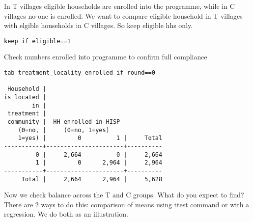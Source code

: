 \documentclass[12pt]{article}
\begin{document}
In T villages eligible households are enrolled into the programme, while in C villages no-one is enrolled. We want to compare eligible household in T villages with elgible households in C villages. So keep eligible hhs only. 

\begin{verbatim}
keep if eligible==1
\end{verbatim}

 Check numbers enrolled into programme to confirm full compliance
\begin{verbatim}
tab treatment_locality enrolled if round==0

 Household |
is located |
        in |
 treatment |
 community |  HH enrolled in HISP
    (0=no, |     (0=no, 1=yes)
    1=yes) |         0          1 |     Total
-----------+----------------------+----------
         0 |     2,664          0 |     2,664 
         1 |         0      2,964 |     2,964 
-----------+----------------------+----------
     Total |     2,664      2,964 |     5,628 

\end{verbatim}

 Now we check balance across the T and C groups. What do 
 you expect to find? 
 There are 2 ways to do this: comparison of means using 
 ttest command or with a regression. We do both as an 
 illustration. 
\end{document}
